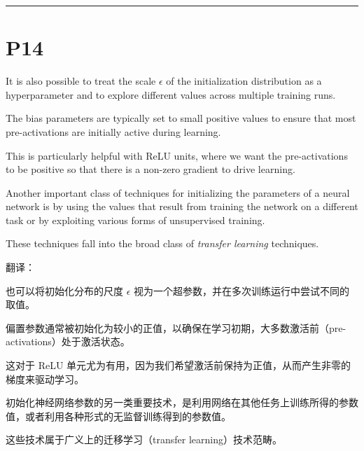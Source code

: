 \documentclass{article}
\begin{document}
\noindent\rule{\linewidth}{0.4pt}

\section{P14}

It is also possible to treat the scale $\epsilon$ of the initialization distribution as a hyperparameter and to explore different values across multiple training runs. 

The bias parameters are typically set to small positive values to ensure that most pre-activations are initially active during learning. 

This is particularly helpful with ReLU units, where we want the pre-activations to be positive so that there is a non-zero gradient to drive learning.

Another important class of techniques for initializing the parameters of a neural network is by using the values that result from training the network on a different task or by exploiting various forms of unsupervised training. 

These techniques fall into the broad class of \emph{transfer learning} techniques.

{\color{red}
翻译：

也可以将初始化分布的尺度 $\epsilon$ 视为一个超参数，并在多次训练运行中尝试不同的取值。

偏置参数通常被初始化为较小的正值，以确保在学习初期，大多数激活前（pre-activations）处于激活状态。

这对于 ReLU 单元尤为有用，因为我们希望激活前保持为正值，从而产生非零的梯度来驱动学习。

初始化神经网络参数的另一类重要技术，是利用网络在其他任务上训练所得的参数值，或者利用各种形式的无监督训练得到的参数值。

这些技术属于广义上的迁移学习（transfer learning）技术范畴。

}
\end{document}
